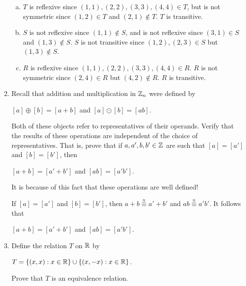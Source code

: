\documentclass[11pt,fleqn,dvipsnames,usenames]{article}
\newcommand{\p}{\noindent}
\begin{document}
\begin{enumerate}
\solution
\begin{enumerate}[(a)]
\item $T$ is reflexive since $(1,1), (2,2), (3,3), (4,4)\in T$, but is not symmetric since $(1,2)\in T$ and $(2,1)\notin T$.  $T$ is transitive.
\item $S$ is not reflexive since $(1,1)\notin S$, and is not reflexive since $(3,1)\in S$ and $(1,3)\notin S$.  $S$ is not transitive since $(1,2),(2,3)\in S$ but $(1,3)\notin S$.
\item $R$ is reflexive since $(1,1), (2,2), (3,3), (4,4)\in R$.  $R$ is not symmetric since $(2,4)\in R$ but $(4,2)\notin R$.  $R$ is transitive.
\end{enumerate}

\item Recall that addition and multiplication in $\mathbb{Z}_n$ were defined by
\begin{center}
$[a] \oplus [b] = [a + b]$ and $[a]\odot [b] = [ab]$.
\end{center}
\p Both of these objects refer to representatives of their operands.  Verify that the results of these operations are independent of the choice of representatives.  That is, prove that if $a,a',b,b'\in\mathbb{Z}$ are such that $[a] = [a']$ and $[b] = [b']$, then
\begin{center}
$[a + b] = [a' + b']$ and $[ab] = [a'b']$.
\end{center}

\note It is because of this fact that these operations are well defined!
\vsmsp

\solution If $[a] = [a']$ and $[b] = [b']$, then $a + b \overset{n}{\equiv} a' + b'$ and $ab \overset{n}{\equiv} a'b'$.  It follows that
\begin{center}
$[a+b] = [a'+b']$ and $[ab] = [a'b']$.
\end{center}

\item Define the relation $T$ on $\mathbb{R}$ by
\begin{center}
$T = \left\{(x,x): x\in\mathbb{R}\right\}\cup \left\{(x,-x): x\in\mathbb{R}\right\}$.
\end{center}
Prove that $T$ is an equivalence relation.
\vsmsp


\end{enumerate}
\end{document}
